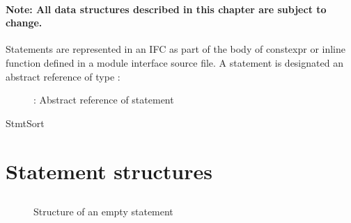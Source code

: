 \label{sec:ifc-statements}

\paragraph{Note: All data structures described in this chapter are subject to change.}

Statements are represented in an IFC as part of the body of constexpr or inline function defined in a
module interface source file.  A statement is designated an abstract reference of type :
\begin{figure}[H]
  \centering
  \caption{: Abstract reference of statement}
  \label{fig:ifc-stmt-index}
\end{figure}

\begin{SortEnum}{StmtSort}
\end{SortEnum}

\section{Statement structures}
\label{sec:ifc-ststement-structures}

\subsection{}
\label{sec:ifc:StmtSort:VendorExtension}



\subsection{}
\label{sec:ifc:StmtSort:Empty}

\begin{figure}[H]
	\centering
	\caption{Structure of an empty statement}
	\label{fig:ifc-empty-stmt-structure}
\end{figure}


